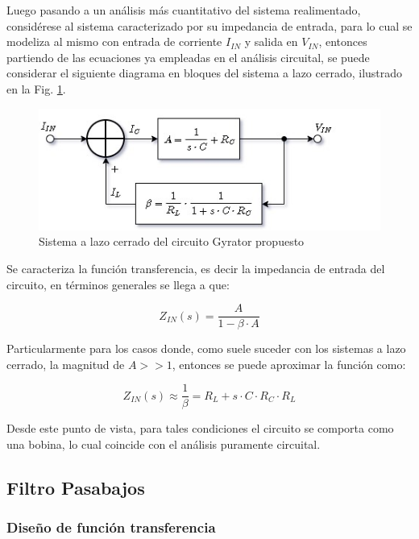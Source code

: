 Luego pasando a un an\'alisis m\'as cuantitativo del sistema realimentado, consid\'erese al sistema caracterizado por su impedancia de entrada, para lo cual se modeliza al mismo con entrada de corriente $I_{IN}$ y salida en $V_{IN}$,
entonces partiendo de las ecuaciones ya empleadas en el an\'alisis circuital, se puede considerar el siguiente diagrama en bloques del sistema a lazo cerrado, ilustrado en la Fig. \ref{fig:sistema_gyrator}.

\begin{figure}[H]
    \centering
    \includegraphics[scale=0.7]{../EJ2/Recursos/sistema_gyrator.jpg}
    \caption{Sistema a lazo cerrado del circuito Gyrator propuesto}
    \label{fig:sistema_gyrator}
\end{figure}

Se caracteriza la funci\'on transferencia, es decir la impedancia de entrada del circuito, en t\'erminos generales se llega a que:

\begin{equation}
    Z_{IN}(s) = \frac{A}{1 - \beta \cdot A}
\end{equation}

Particularmente para los casos donde, como suele suceder con los sistemas a lazo cerrado, la magnitud de $A >> 1$, entonces se puede aproximar
la funci\'on como:

\begin{equation}
    Z_{IN}(s) \approx \frac{1}{\beta} = R_L + s \cdot C \cdot R_C \cdot R_L
\end{equation}

Desde este punto de vista, para tales condiciones el circuito se comporta como una bobina, lo cual coincide con el an\'alisis puramente circuital.

\subsection{Filtro Pasabajos}

\subsubsection{Dise\~no de funci\'on transferencia}


